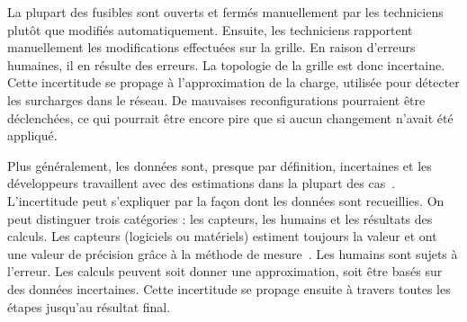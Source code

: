 %
La plupart des fusibles sont ouverts et fermés manuellement par les techniciens plutôt que modifiés automatiquement. 
Ensuite, les techniciens rapportent manuellement les modifications effectuées sur la grille.
En raison d'erreurs humaines, il en résulte des erreurs.
La topologie de la grille est donc incertaine.
Cette incertitude se propage à l'approximation de la charge, utilisée pour détecter les surcharges dans le réseau.
De mauvaises reconfigurations pourraient être déclenchées, ce qui pourrait être encore pire que si aucun changement n'avait été appliqué.

%
Plus généralement, les données sont, presque par définition, incertaines et les développeurs travaillent avec des estimations dans la plupart des cas~\cite{DBLP:conf/asplos/BornholtMM14, metrology2008evaluation, DBLP:journals/tkde/AggarwalY09}.
L'incertitude peut s'expliquer par la façon dont les données sont recueillies.
On peut distinguer trois catégories : les capteurs, les humains et les résultats des calculs.
Les capteurs (logiciels ou matériels) estiment toujours la valeur et ont une valeur de précision grâce à la méthode de mesure~\cite{metrology2008evaluation, DBLP:conf/asplos/BornholtMM14}.
Les humains sont sujets à l'erreur.
Les calculs peuvent soit donner une approximation, soit être basés sur des données incertaines.
Cette incertitude se propage ensuite à travers toutes les étapes jusqu'au résultat final.


